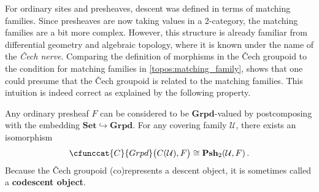         For ordinary sites and presheaves, descent was defined in terms of matching families. Since presheaves are now taking values in a 2-category, the matching families are a bit more complex. However, this structure is already familiar from differential geometry and algebraic topology, where it is known under the name of the \textit{\v{C}ech nerve}.
        Comparing the definition of morphisms in the \v{C}ech groupoid to the condition for matching families in \cref{topos:matching_family}, shows that one could presume that the \v{C}ech groupoid is related to the matching families. This intuition is indeed correct as explained by the following property.
        \begin{property}\label{topos:cech_matching_families}
            Any ordinary presheaf $F$ can be considered to be $\mathbf{Grpd}$-valued by postcomposing with the embedding $\mathbf{Set}\hookrightarrow\mathbf{Grpd}$. For any covering family $\mathcal{U}$, there exists an isomorphism
            \begin{gather}
                \cfunccat{C}{Grpd}\bigl(C(\mathcal{U}),F\bigr)\cong\mathbf{Psh}_2(\mathcal{U},F)\,.
            \end{gather}
            Because the \v{C}ech groupoid (co)represents a descent object, it is sometimes called a \textbf{codescent object}.
        \end{property}
